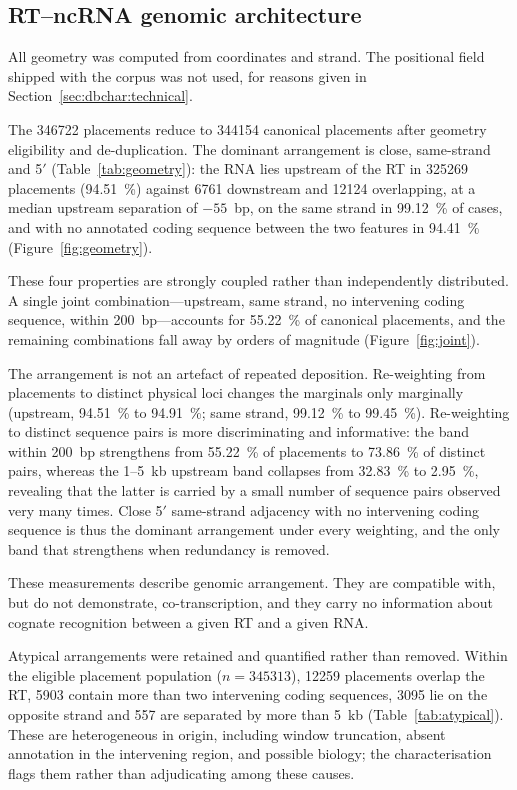 \subsection{RT--ncRNA genomic architecture}
\label{sec:dbchar:geometry}

All geometry was computed from coordinates and strand. The positional field shipped with the corpus
was not used, for reasons given in Section~\ref{sec:dbchar:technical}.

The \num{346722} placements reduce to \num{344154} canonical placements after geometry eligibility
and de-duplication. The dominant arrangement is close, same-strand and 5$'$ (Table~\ref{tab:geometry}):
the RNA lies upstream of the RT in \num{325269} placements (\SI{94.51}{\percent}) against \num{6761}
downstream and \num{12124} overlapping, at a median upstream separation of $-55$~bp, on the same
strand in \SI{99.12}{\percent} of cases, and with no annotated coding sequence between the two
features in \SI{94.41}{\percent} (Figure~\ref{fig:geometry}).

These four properties are strongly coupled rather than independently distributed. A single joint
combination---upstream, same strand, no intervening coding sequence, within 200~bp---accounts for
\SI{55.22}{\percent} of canonical placements, and the remaining combinations fall away by orders of
magnitude (Figure~\ref{fig:joint}).

The arrangement is not an artefact of repeated deposition. Re-weighting from placements to distinct
physical loci changes the marginals only marginally (upstream, \SI{94.51}{\percent} to
\SI{94.91}{\percent}; same strand, \SI{99.12}{\percent} to \SI{99.45}{\percent}). Re-weighting to
distinct sequence pairs is more discriminating and informative: the band within 200~bp strengthens
from \SI{55.22}{\percent} of placements to \SI{73.86}{\percent} of distinct pairs, whereas the
1--5~kb upstream band collapses from \SI{32.83}{\percent} to \SI{2.95}{\percent}, revealing that the
latter is carried by a small number of sequence pairs observed very many times. Close 5$'$
same-strand adjacency with no intervening coding sequence is thus the dominant arrangement under
every weighting, and the only band that strengthens when redundancy is removed.

These measurements describe genomic arrangement. They are compatible with, but do not demonstrate,
co-transcription, and they carry no information about cognate recognition between a given RT and a
given RNA.

Atypical arrangements were retained and quantified rather than removed. Within the eligible
placement population ($n=\num{345313}$), \num{12259} placements overlap the RT, \num{5903} contain
more than two intervening coding sequences, \num{3095} lie on the opposite strand and 557 are
separated by more than 5~kb (Table~\ref{tab:atypical}). These are heterogeneous in origin, including
window truncation, absent annotation in the intervening region, and possible biology; the
characterisation flags them rather than adjudicating among these causes.

